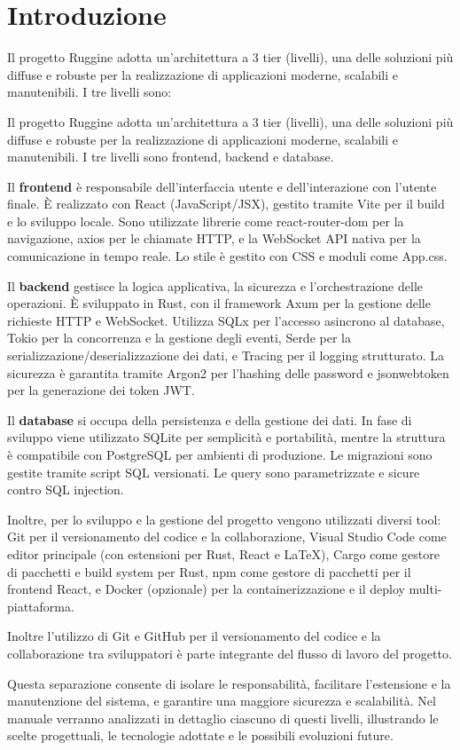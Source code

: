 \chapter{Introduzione}
Il progetto Ruggine adotta un'architettura a 3 tier (livelli), una delle soluzioni più diffuse e robuste per la realizzazione di applicazioni moderne, scalabili e manutenibili. I tre livelli sono:

Il progetto Ruggine adotta un'architettura a 3 tier (livelli), una delle soluzioni più diffuse e robuste per la realizzazione di applicazioni moderne, scalabili e manutenibili. I tre livelli sono frontend, backend e database.

Il \textbf{frontend} è responsabile dell'interfaccia utente e dell'interazione con l'utente finale. È realizzato con React (JavaScript/JSX), gestito tramite Vite per il build e lo sviluppo locale. Sono utilizzate librerie come react-router-dom per la navigazione, axios per le chiamate HTTP, e la WebSocket API nativa per la comunicazione in tempo reale. Lo stile è gestito con CSS e moduli come App.css.

Il \textbf{backend} gestisce la logica applicativa, la sicurezza e l'orchestrazione delle operazioni. È sviluppato in Rust, con il framework Axum per la gestione delle richieste HTTP e WebSocket. Utilizza SQLx per l'accesso asincrono al database, Tokio per la concorrenza e la gestione degli eventi, Serde per la serializzazione/deserializzazione dei dati, e Tracing per il logging strutturato. La sicurezza è garantita tramite Argon2 per l'hashing delle password e jsonwebtoken per la generazione dei token JWT.

Il \textbf{database} si occupa della persistenza e della gestione dei dati. In fase di sviluppo viene utilizzato SQLite per semplicità e portabilità, mentre la struttura è compatibile con PostgreSQL per ambienti di produzione. Le migrazioni sono gestite tramite script SQL versionati. Le query sono parametrizzate e sicure contro SQL injection.

Inoltre, per lo sviluppo e la gestione del progetto vengono utilizzati diversi tool: Git per il versionamento del codice e la collaborazione, Visual Studio Code come editor principale (con estensioni per Rust, React e LaTeX), Cargo come gestore di pacchetti e build system per Rust, npm come gestore di pacchetti per il frontend React, e Docker (opzionale) per la containerizzazione e il deploy multi-piattaforma.

Inoltre l'utilizzo di Git e GitHub per il versionamento del codice e la collaborazione tra sviluppatori è parte integrante del flusso di lavoro del progetto.

Questa separazione consente di isolare le responsabilità, facilitare l'estensione e la manutenzione del sistema, e garantire una maggiore sicurezza e scalabilità. Nel manuale verranno analizzati in dettaglio ciascuno di questi livelli, illustrando le scelte progettuali, le tecnologie adottate e le possibili evoluzioni future.